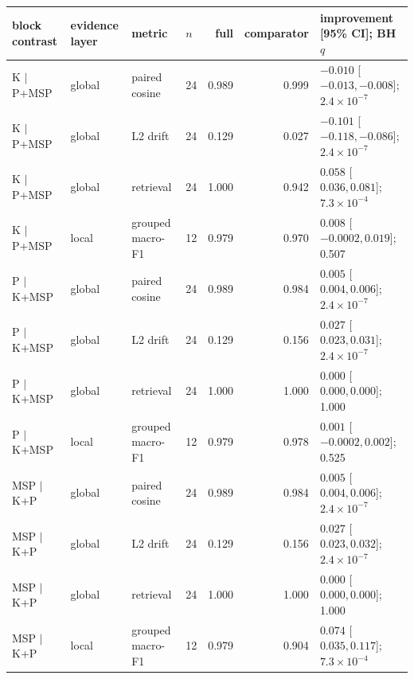 \begin{tabular}{@{}llllrrl@{}}
\toprule
\textbf{block contrast} & \textbf{evidence layer} & \textbf{metric} & \textbf{$n$} & \textbf{full} & \textbf{comparator} & \textbf{improvement [95\% CI]; BH $q$} \\
\midrule
K $\mid$ P+MSP & global & paired cosine & 24 & 0.989 & 0.999 & $-0.010$ [$-0.013,-0.008$]; $2.4\times10^{-7}$ \\
K $\mid$ P+MSP & global & L2 drift & 24 & 0.129 & 0.027 & $-0.101$ [$-0.118,-0.086$]; $2.4\times10^{-7}$ \\
K $\mid$ P+MSP & global & retrieval & 24 & 1.000 & 0.942 & $0.058$ [$0.036,0.081$]; $7.3\times10^{-4}$ \\
K $\mid$ P+MSP & local & grouped macro-F1 & 12 & 0.979 & 0.970 & $0.008$ [$-0.0002,0.019$]; 0.507 \\
\addlinespace
P $\mid$ K+MSP & global & paired cosine & 24 & 0.989 & 0.984 & $0.005$ [$0.004,0.006$]; $2.4\times10^{-7}$ \\
P $\mid$ K+MSP & global & L2 drift & 24 & 0.129 & 0.156 & $0.027$ [$0.023,0.031$]; $2.4\times10^{-7}$ \\
P $\mid$ K+MSP & global & retrieval & 24 & 1.000 & 1.000 & $0.000$ [$0.000,0.000$]; 1.000 \\
P $\mid$ K+MSP & local & grouped macro-F1 & 12 & 0.979 & 0.978 & $0.001$ [$-0.0002,0.002$]; 0.525 \\
\addlinespace
MSP $\mid$ K+P & global & paired cosine & 24 & 0.989 & 0.984 & $0.005$ [$0.004,0.006$]; $2.4\times10^{-7}$ \\
MSP $\mid$ K+P & global & L2 drift & 24 & 0.129 & 0.156 & $0.027$ [$0.023,0.032$]; $2.4\times10^{-7}$ \\
MSP $\mid$ K+P & global & retrieval & 24 & 1.000 & 1.000 & $0.000$ [$0.000,0.000$]; 1.000 \\
MSP $\mid$ K+P & local & grouped macro-F1 & 12 & 0.979 & 0.904 & $0.074$ [$0.035,0.117$]; $7.3\times10^{-4}$ \\
\bottomrule
\end{tabular}
